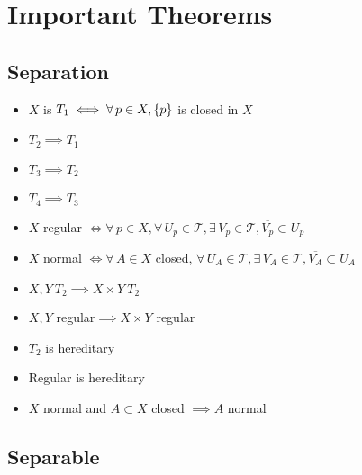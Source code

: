 \documentclass[letterpaper,12pt,fleqn]{article}
\newcommand{\T}{\mathscr{T}}
\begin{document}
\section*{Important Theorems}

\subsection*{Separation}

\begin{itemize}
\item \(X\) is \(T_1\iff\forall\,p\in X,\{p\}\) is closed in \(X\)

\item \(T_2\implies T_1\)

\item \(T_3\implies T_2\)

\item \(T_4\implies T_3\)

\item \(X\) regular \(\iff\forall\,p\in X,\forall\,U_p\in\T,\exists\,V_p\in\T,\overline{V_p}\subset U_p\)

\item \(X\) normal \(\iff\forall\,A\in X\) closed, \(\forall\,U_A\in\T,\exists\,V_A\in\T,
  \overline{V_A}\subset U_A\)

\item \(X,Y\ T_2\implies X\times Y\ T_2\)

\item \(X,Y\) regular\(\implies X\times Y\) regular

\item \(T_2\) is hereditary

\item Regular is hereditary

\item \(X\) normal and \(A\subset X\) closed \(\implies A\) normal
\end{itemize}

\subsection*{Separable}
\end{document}
